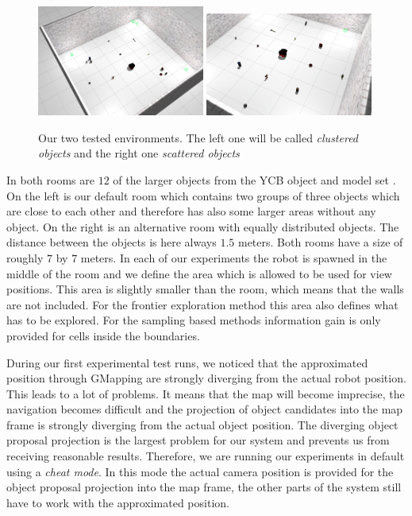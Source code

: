 \documentclass[a4paper,11pt,english]{article}
\begin{document}
\begin{figure}[h!]
	\begin{center}
		\includegraphics[width=0.49\textwidth]{src/clustered.png}
		\includegraphics[width=0.49\textwidth]{src/scattered.png}
		\caption{Our two tested environments. The left one will be called \textit{clustered objects} and the right one \textit{scattered objects}}
		\label{fig:rooms}
	\end{center}
\end{figure}

In both rooms are $12$ of the larger objects from the YCB object and model set \cite{calli2015benchmarking}.
On the left is our default room which contains two groups of three objects which are close to each other and therefore has also some larger areas without any object.
On the right is an alternative room with equally distributed objects. The distance between the objects is here always $1.5$ meters. Both rooms have a size of roughly $7$ by $7$ meters.
In each of our experiments the robot is spawned in the middle of the room and we define the area which is allowed to be used for view positions. This area is slightly smaller than the room, which means that the walls are not included.
For the frontier exploration method this area also defines what has to be explored.
For the sampling based methods information gain is only provided for cells inside the boundaries.

During our first experimental test runs, we noticed that the approximated position through GMapping are strongly diverging from the actual robot position.
This leads to a lot of problems. It means that the map will become imprecise, the navigation becomes difficult and the projection of object candidates into the map frame is strongly diverging from the actual object position.
The diverging object proposal projection is the largest problem for our system and prevents us from receiving reasonable results. Therefore, we are running our experiments in default using a \textit{cheat mode}.
In this mode the actual camera position is provided for the object proposal projection into the map frame, the other parts of the system still have to work with the approximated position.
\end{document}
